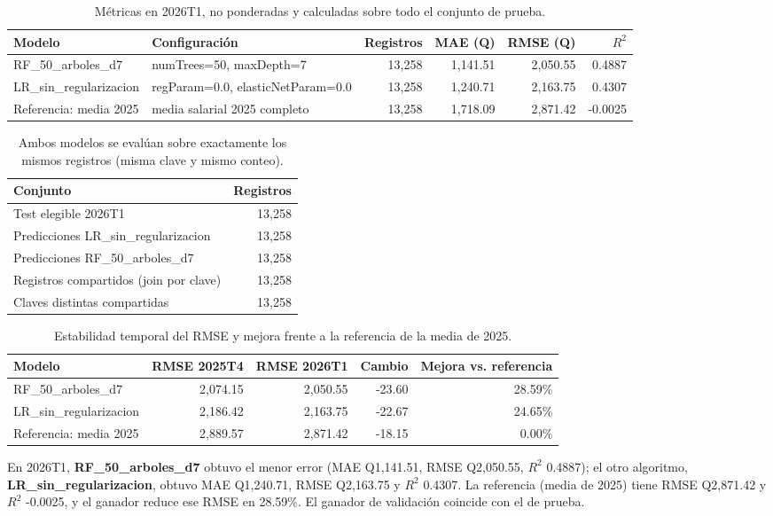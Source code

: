 \begin{table}[htbp]\centering\footnotesize
\begin{tabular}{llrrrr}\toprule
Modelo & Configuración & Registros & MAE (Q) & RMSE (Q) & $R^2$ \\ \midrule
RF\_50\_arboles\_d7 & numTrees=50, maxDepth=7 & 13,258 & 1,141.51 & 2,050.55 & 0.4887 \\
LR\_sin\_regularizacion & regParam=0.0, elasticNetParam=0.0 & 13,258 & 1,240.71 & 2,163.75 & 0.4307 \\
Referencia: media 2025 & media salarial 2025 completo & 13,258 & 1,718.09 & 2,871.42 & -0.0025 \\
\bottomrule\end{tabular}
\caption{Métricas en 2026T1, no ponderadas y calculadas sobre todo el conjunto de prueba.}
\end{table}
\begin{table}[htbp]\centering\small
\begin{tabular}{lr}\toprule
Conjunto & Registros \\ \midrule
Test elegible 2026T1 & 13,258 \\
Predicciones LR\_sin\_regularizacion & 13,258 \\
Predicciones RF\_50\_arboles\_d7 & 13,258 \\
Registros compartidos (join por clave) & 13,258 \\
Claves distintas compartidas & 13,258 \\
\bottomrule\end{tabular}
\caption{Ambos modelos se evalúan sobre exactamente los mismos registros (misma clave y mismo conteo).}
\end{table}
\begin{table}[htbp]\centering\footnotesize
\begin{tabular}{lrrrr}\toprule
Modelo & RMSE 2025T4 & RMSE 2026T1 & Cambio & Mejora vs. referencia \\ \midrule
RF\_50\_arboles\_d7 & 2,074.15 & 2,050.55 & -23.60 & 28.59\% \\
LR\_sin\_regularizacion & 2,186.42 & 2,163.75 & -22.67 & 24.65\% \\
Referencia: media 2025 & 2,889.57 & 2,871.42 & -18.15 & 0.00\% \\
\bottomrule\end{tabular}
\caption{Estabilidad temporal del RMSE y mejora frente a la referencia de la media de 2025.}
\end{table}

En 2026T1, \textbf{RF\_50\_arboles\_d7} obtuvo el menor error (MAE Q1,141.51, RMSE Q2,050.55, $R^2$ 0.4887); el otro algoritmo, \textbf{LR\_sin\_regularizacion}, obtuvo MAE Q1,240.71, RMSE Q2,163.75 y $R^2$ 0.4307. La referencia (media de 2025) tiene RMSE Q2,871.42 y $R^2$ -0.0025, y el ganador reduce ese RMSE en 28.59\%. El ganador de validación coincide con el de prueba.
